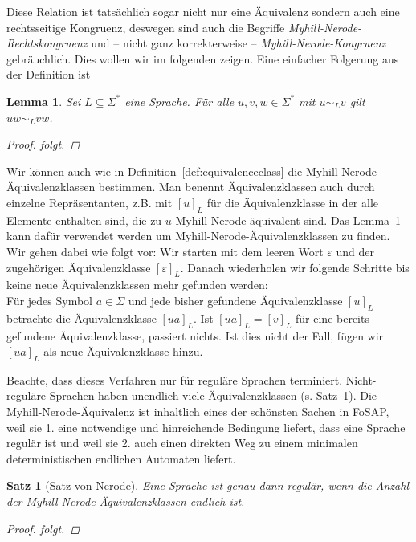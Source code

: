 \documentclass[11pt, a4paper]{article}
\theoremstyle{definition}
\theoremstyle{plain}
\newtheorem{theorem}[definition]{Satz}
\newtheorem{lemma}[definition]{Lemma}
\numberwithin{equation}{section}
\begin{document}
Diese Relation ist tatsächlich sogar nicht nur eine Äquivalenz sondern auch eine rechtsseitige Kongruenz, deswegen sind auch die Begriffe \textit{Myhill-Nerode-Rechtskongruenz} und -- nicht ganz korrekterweise -- \textit{Myhill-Nerode-Kongruenz} gebräuchlich. Dies wollen wir im folgenden zeigen.
Eine einfacher Folgerung aus der Definition ist
\begin{lemma}\label{lem:mncongruence}
	Sei \( L \subseteq \Sigma^\ast \) eine Sprache. Für alle \( u, v, w \in \Sigma^\ast \) mit \( u \sim_L v \) gilt \( uw \sim_L vw \).
	\begin{proof}
		folgt. %
	\end{proof}
\end{lemma}
Wir können auch wie in Definition~\ref{def:equivalenceclass} die Myhill-Nerode-Äquivalenzklassen bestimmen. Man benennt Äquivalenzklassen auch durch einzelne Repräsentanten, z.B. mit \( [u]_L \) für die Äquivalenzklasse in der alle Elemente enthalten sind, die zu \( u \) Myhill-Nerode-äquivalent sind.
Das Lemma~\ref{lem:mncongruence} kann dafür verwendet werden um Myhill-Nerode-Äquivalenzklassen zu finden. Wir gehen dabei wie folgt vor:
Wir starten mit dem leeren Wort \( \varepsilon \) und der zugehörigen Äquivalenzklasse \( [\varepsilon]_L \). Danach wiederholen wir folgende Schritte bis keine neue Äquivalenzklassen mehr gefunden werden:\\
Für jedes Symbol \( a \in \Sigma \) und jede bisher gefundene Äquivalenzklasse \( [u]_L \) betrachte die Äquivalenzklasse \( [ua]_L \). Ist \( [ua]_L = [v]_L \) für eine bereits gefundene Äquivalenzklasse, passiert nichts. Ist dies nicht der Fall, fügen wir \( [ua]_L \) als neue Äquivalenzklasse hinzu.\par
Beachte, dass dieses Verfahren nur für reguläre Sprachen terminiert. Nicht-reguläre Sprachen haben unendlich viele Äquivalenzklassen (s. Satz~\ref{thm:nerode}).
Die Myhill-Nerode-Äquivalenz ist inhaltlich eines der schönsten Sachen in FoSAP, weil sie 1. eine notwendige und hinreichende Bedingung liefert, dass eine Sprache regulär ist und weil sie 2. auch einen direkten Weg zu einem minimalen deterministischen endlichen Automaten liefert.
\begin{theorem}[Satz von Nerode]\label{thm:nerode}
	Eine Sprache ist genau dann regulär, wenn die Anzahl der Myhill-Nerode-Äquivalenzklassen endlich ist.
	\begin{proof}
		folgt. %
	\end{proof}
\end{theorem}
\end{document}

